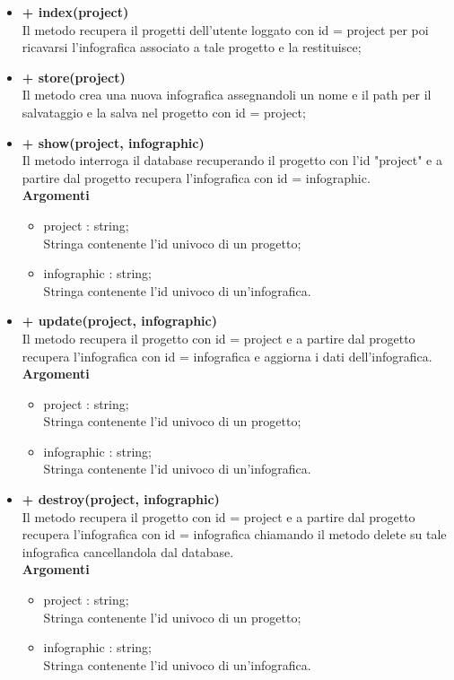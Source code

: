 		\begin{itemize}
			\item \textbf{+ index(project)}\\
			Il metodo recupera il progetti dell'utente loggato con id = project per poi ricavarsi l'infografica associato a tale progetto e la restituisce;
			\item \textbf{+ store(project)}\\
			Il metodo crea una nuova infografica assegnandoli un nome e il path per il salvataggio e la salva nel progetto con id = project;
			\item \textbf{+ show(project, infographic)}\\
			Il metodo interroga il database recuperando il progetto con l'id "project" e a partire dal progetto recupera l'infografica con id = infographic.\\
			\textbf{Argomenti}
			\begin{itemize}
				\item project : string; \\
				Stringa contenente l'id univoco di un progetto;
				\item infographic : string; \\
				Stringa contenente l'id univoco di un'infografica.
			\end{itemize}
			\item \textbf{+ update(project, infographic)}\\
			Il metodo recupera il progetto con id = project e a partire dal progetto recupera l'infografica con id = infografica e aggiorna i dati dell'infografica.\\
			\textbf{Argomenti}
			\begin{itemize}
				\item project : string; \\
				Stringa contenente l'id univoco di un progetto;
				\item infographic : string; \\
				Stringa contenente l'id univoco di un'infografica.
			\end{itemize}
			\item \textbf{+ destroy(project, infographic)}\\
			Il metodo recupera il progetto con id = project e a partire dal progetto recupera l'infografica con id = infografica chiamando il metodo delete su tale infografica cancellandola dal database.\\
			\textbf{Argomenti}
			\begin{itemize}
				\item project : string; \\
				Stringa contenente l'id univoco di un progetto;
				\item infographic : string; \\
				Stringa contenente l'id univoco di un'infografica.
			\end{itemize}
		\end{itemize}
		
